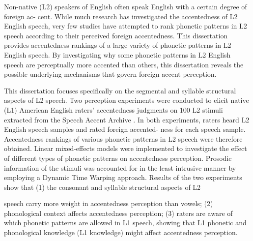 \documentclass[11 pt]{report}
\begin{document}

\tableofcontents

\listoftables

\listoffigures
%
%


\abstractpage
Non-native (L2) speakers of English often speak English with a certain degree of foreign ac- cent. While much research has investigated the accentedness of L2 English speech, very few   studies have attempted to rank phonetic patterns in L2 speech according to their perceived foreign accentedness. This dissertation provides accentedness rankings of a large variety of phonetic patterns in L2 English speech. By investigating why some phonetic patterns in L2 English speech are perceptually more accented than others, this dissertation reveals the possible underlying mechanisms that govern foreign accent perception.

This dissertation focuses specifically on the segmental and syllable structural aspects of L2 speech. Two perception experiments were conducted to elicit native (L1) American English raters’ accentedness judgments on 100 L2 stimuli extracted from the Speech Accent Archive \autocite{Weinberger_saa_2019}. In both experiments, raters heard L2 English speech samples and rated foreign accented- ness for each speech sample. Accentedness rankings of various phonetic patterns in L2 speech were therefore obtained. Linear mixed-effects models were implemented to investigate the effect of different types of phonetic patterns on accentedness perception. Prosodic information of the stimuli was accounted for in the least intrusive manner by employing a Dynamic Time Warping approach. Results of the two experiments show that (1) the consonant and syllable structural aspects of L2

\abstractmultiplepage

\noindent speech carry more weight in accentedness perception than vowels; (2) phonological context affects accentedness perception; (3) raters are aware of which phonetic patterns are allowed in L1 speech, showing that L1 phonetic and phonological knowledge (L1 knowledge) might affect accentedness perception.
\end{document}
